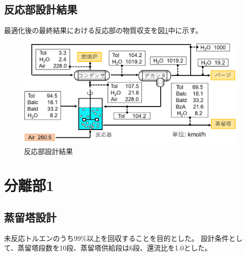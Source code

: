 \documentclass[a4j]{jsreport}
\begin{document}
\section{反応部設計結果}
最適化後の最終結果における反応部の物質収支を図\ref{反応部設計結果の図}中に示す。
\begin{figure}[h]
    \label{反応部設計結果の図}
    \begin{center}
        \includegraphics[scale=0.7]{ReactionSectionConclusion.png}
        \caption{反応部設計結果}
    \end{center}
\end{figure}


\newpage
\chapter{分離部1}
\section{蒸留塔設計}
未反応トルエンのうち99\%以上を回収することを目的とした。
設計条件として、蒸留塔段数を10段、蒸留塔供給段は6段、還流比を1.0とした。
\end{document}
